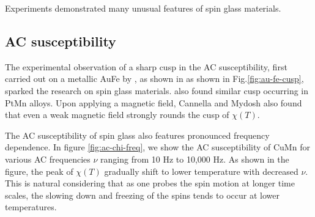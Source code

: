 Experiments demonstrated many unusual features of spin glass materials.

\subsection{AC susceptibility}
The experimental observation of a sharp cusp in the AC susceptibility, first
carried out on a metallic AuFe by \citet{PhysRevB.6.4220}, as shown in as shown in Fig.\ref{fig:au-fe-cusp}, 
sparked the research on spin glass materials. 
\citet{THOLENCE1977875,:/content/aip/proceeding/aipcp/10.1063/1.30603,
:/content/aip/proceeding/aipcp/10.1063/1.30565} also found similar cusp occurring in PtMn alloys.
Upon applying a magnetic field, Cannella and Mydosh also found that even a weak
magnetic field strongly rounds the cusp of $\chi(T)$.

The AC susceptibility of spin glass also features pronounced frequency dependence. 
In figure \ref{fig:ac-chi-freq}, we show the AC susceptibility of CuMn for various
AC frequencies $\nu$ ranging from 10 Hz to 10,000 Hz. As shown in the figure, the
peak of $\chi(T)$ gradually shift to lower temperature with decreased $\nu$.
This is natural considering that as one probes the spin motion at longer time scales,
the slowing down and freezing of the spins tends to occur at lower temperatures.

